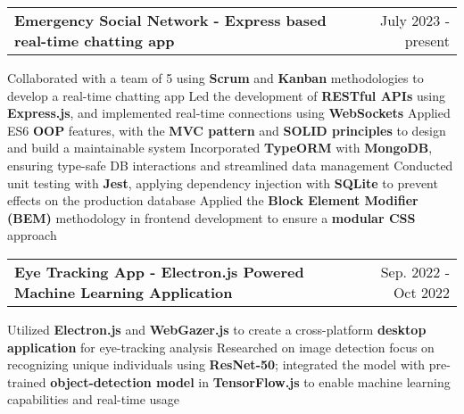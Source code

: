 \newcommand{\resumeProjEntry}[2]{
    \vspace{5pt}\item
      \begin{tabular*}{0.97\textwidth}{l@{\extracolsep{\fill}}r}
        \textbf{#1} & \small #2\\
      \end{tabular*}\vspace{-5pt}
}

\resumeProjEntry
{Emergency Social Network - Express based real-time chatting app}
{July 2023 - present}
{
    \resumeItemListStart
        \resumeItem
        {Collaborated with a team of 5 using \textbf{Scrum} and \textbf{Kanban} methodologies to develop a real-time chatting app}
        \resumeItem
        {Led the development of \textbf{RESTful APIs} using \textbf{Express.js}, and implemented real-time connections using \textbf{WebSockets}}
        \resumeItem
        {Applied ES6 \textbf{OOP} features, with the \textbf{MVC pattern} and \textbf{SOLID principles} to design and build a maintainable system}
        \resumeItem
        {Incorporated \textbf{TypeORM} with \textbf{MongoDB}, ensuring type-safe DB interactions and streamlined data management}
        \resumeItem
        {Conducted unit testing with \textbf{Jest}, applying dependency injection with \textbf{SQLite} to prevent effects on the production database}
        \resumeItem
        {Applied the \textbf{Block Element Modifier (BEM)} methodology in frontend development to ensure a \textbf{modular CSS} approach}
    \resumeItemListEnd
}


\resumeProjEntry
{Eye Tracking App - Electron.js Powered Machine Learning Application}
{Sep. 2022 - Oct 2022}
{
    \resumeItemListStart
        \resumeItem
        {Utilized \textbf{Electron.js} and \textbf{WebGazer.js} to create a cross-platform \textbf{desktop application} for eye-tracking analysis}
        \resumeItem
        {Researched on image detection focus on recognizing unique individuals using \textbf{ResNet-50}; integrated the model with pre-trained \textbf{object-detection model} in \textbf{TensorFlow.js} to enable machine learning capabilities and real-time usage}
    \resumeItemListEnd
}


